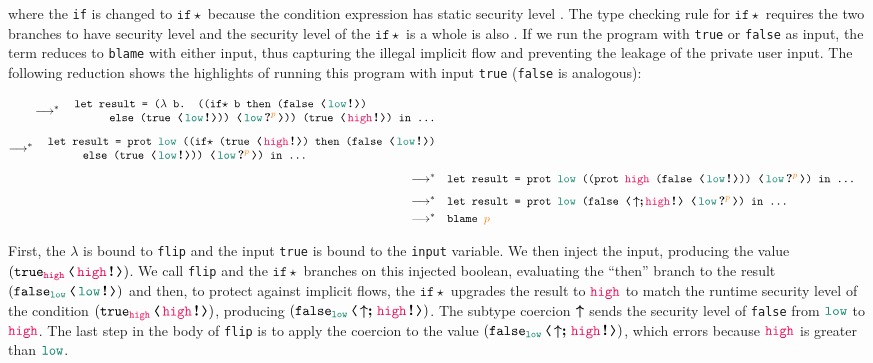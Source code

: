 \noindent where the \texttt{if} is changed
to $\mathtt{if}\star$ because the condition expression has static
security level \unk{}.  The type checking rule for $\mathtt{if}\star$
requires the two branches to have security level \unk{} and the
security level of the $\mathtt{if}\star$ is a whole is also \unk{}.
%
If we run the program with \texttt{true} or \texttt{false} as input, the \CC
term reduces to \texttt{blame}  with either input, thus capturing the
illegal implicit flow and preventing the leakage of the private user input. The
following reduction shows the highlights of running this program with input
\texttt{true} (\texttt{false} is analogous):

{\small
  \begin{align*}
    \longrightarrow^{*}
    \begin{split}
      &\quad \texttt{let result = ($\lambda$ b. ((if${\star}$ b then (false ⟨\,\inj{\low}\,⟩)} \\[-3pt]
      &\quad\quad\qquad\texttt{else (true ⟨\,\inj{\low}\,⟩)) ⟨\,\proj{\low}{p}\,⟩)) (true ⟨\,\inj{\high}\,⟩) in ...}
    \end{split} \\[1ex]
    \longrightarrow^{*}
    \begin{split}
      &\quad \texttt{let result = prot \low ((if${\star}$ (true ⟨\,\inj{\high}\,⟩) then (false ⟨\,\inj{\low}\,⟩)} \\[-3pt]
      &\quad\quad\qquad\texttt{else (true ⟨\,\inj{\low}\,⟩)) ⟨\,\proj{\low}{p}\,⟩) in ...}
    \end{split}\\[1ex]
    \longrightarrow^{*} &
    \quad \texttt{let result = prot \low ((prot \high (false ⟨\,\inj{\low}\,⟩)) ⟨\,\proj{\low}{p}\,⟩) in ...} \\[1ex]
    \longrightarrow^{*} &
    \quad\texttt{let result = prot \low (false ⟨\,\up\seq\inj{\high}\,⟩ ⟨\,\proj{\low}{p}\,⟩) in ...} \\
    \longrightarrow^{*} &
    \quad\texttt{blame \bl{p}}
\end{align*}}

First, the $\lambda$ is bound to \texttt{flip} and the input \texttt{true} is
bound to the \texttt{input} variable. We then inject the input, producing the
value $(\cccast{\true_{\high}}{\inj{\high}})$. We call \texttt{flip} and the
$\mathtt{if}\star$ branches on this injected boolean, evaluating the ``then''
branch to the result $(\cccast{\false_{\low}}{\inj{\low}})$ and then, to protect
against implicit flows, the $\mathtt{if}\star$ upgrades the result to $\high$ to
match the runtime security level of the condition
$(\cccast{\true_{\high}}{\inj{\high}})$, producing
$(\cccast{\false_{\low}}{\up\seq\inj{\high}})$. The subtype coercion $\boldsymbol{\uparrow}$ sends
the security level of \texttt{false} from $\low$ to $\high$. The last step in
the body of \texttt{flip} is to apply the coercion \texttt{} to
the value $(\cccast{\false_{\low}}{\up\seq\inj{\high}})$, which errors because
$\high$ is greater than $\low$.

